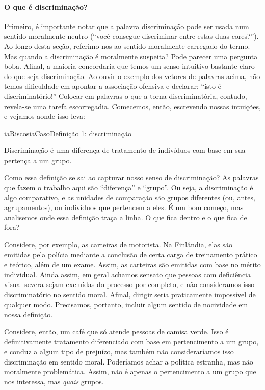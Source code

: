 \documentclass[
  11pt,
]{article}
\newenvironment{definicao}[1][Definicao]{\begin{iabox}{iaRiscos}{iaCaso}{#1}}{\end{iabox}}
\begin{document}
\paragraph{O que é discriminação?}\label{o-que-uxe9-discriminauxe7uxe3o}

Primeiro, é importante notar que a palavra discriminação pode ser usada
num sentido moralmente neutro (``você consegue discriminar entre estas
duas cores?''). Ao longo desta seção, referimo-nos ao sentido moralmente
carregado do termo. Mas quando a discriminação é moralmente suspeita?
Pode parecer uma pergunta boba. Afinal, a maioria concordaria que temos
um senso intuitivo bastante claro do que seja discriminação. Ao ouvir o
exemplo dos vetores de palavras acima, não temos dificuldade em apontar
a associação ofensiva e declarar: ``isto é discriminatório!'' Colocar em
palavras o que a torna discriminatória, contudo, revela-se uma tarefa
escorregadia. Comecemos, então, escrevendo nossas intuições, e vejamos
aonde isso leva:

\begin{definicao}[Definição 1: discriminação]

Discriminação é uma diferença de tratamento de indivíduos com base em
sua pertença a um grupo.

\end{definicao}

Como essa definição se sai ao capturar nosso senso de discriminação? As
palavras que fazem o trabalho aqui são ``diferença'' e ``grupo''. Ou
seja, a discriminação é algo comparativo, e as unidades de comparação
são grupos diferentes (ou, antes, agrupamentos), ou indivíduos que
pertencem a eles. É um bom começo, mas analisemos onde essa definição
traça a linha. O que fica dentro e o que fica de fora?

Considere, por exemplo, as carteiras de motorista. Na Finlândia, elas
são emitidas pela polícia mediante a conclusão de certa carga de
treinamento prático e teórico, além de um exame. Assim, as carteiras são
emitidas com base no mérito individual. Ainda assim, em geral achamos
sensato que pessoas com deficiência visual severa sejam excluídas do
processo por completo, e não consideramos isso discriminatório no
sentido moral. Afinal, dirigir seria praticamente impossível de qualquer
modo. Precisamos, portanto, incluir algum sentido de nocividade em nossa
definição.

Considere, então, um café que só atende pessoas de camisa verde. Isso é
definitivamente tratamento diferenciado com base em pertencimento a um
grupo, e conduz a algum tipo de prejuízo, mas também não consideraríamos
isso discriminação em sentido moral. Poderíamos achar a política
estranha, mas não moralmente problemática. Assim, não é apenas o
pertencimento a um grupo que nos interessa, mas \emph{quais} grupos.
\end{document}
